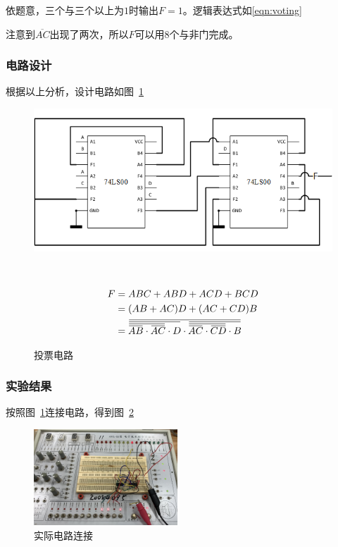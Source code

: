 \documentclass[a4paper,twoside]{ctexart}
\newcommand{\ols}[1]{\mskip.5\thinmuskip\overline{\mskip-.5\thinmuskip {#1} \mskip-.5\thinmuskip}\mskip.5\thinmuskip}
\begin{document}
\begin{spacing}{1.2}
依题意，三个与三个以上为$1$时输出$F=1$。逻辑表达式如\eqref{eqn:voting}


注意到$\overline{AC}$出现了两次，所以$F$可以用8个与非门完成。

\subsubsection{电路设计}

根据以上分析，设计电路如图~\ref{fig:voting}

\begin{figure}[h]
	\centering
	\begin{minipage}{0.48\linewidth}
		\caption{投票电路}
		\label{fig:voting}
		\centering
		\includegraphics[width=\textwidth]{fig1.png}
	\end{minipage}
	~
	\begin{minipage}{0.48\linewidth}
		\centering
		\begin{equation}
			\label{eqn:voting}
			\begin{aligned}
				F&=ABC+ABD+ACD+BCD \\
				&=(AB+AC)D+(AC+CD)B \\
				&=\ols{\ols{\ols{\ols{AB}\cdot\ols{AC}}\cdot D}\cdot \ols{\ols{\ols{AC}\cdot\ols{CD}}\cdot B } }
			\end{aligned}
		\end{equation}
	\end{minipage}
\end{figure}

\subsubsection{实验结果}

按照图~\ref{fig:voting}连接电路，得到图~\ref{fig:res21}

\begin{figure}[h]
	\centering
	\caption{实际电路连接}
	\label{fig:res21}
	\includegraphics[width=0.48\textwidth,angle=90,origin=c]{fig_res21.png}
\end{figure}



\end{spacing}
\end{document}
